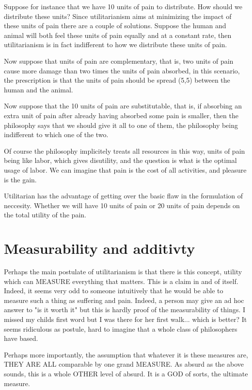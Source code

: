 \documentclass[12pt]{report}
\numberwithin{equation}{section}
\begin{document}
Suppose for instance that we have 10 units of pain to distribute. How should we distribute these units? Since utilitarianism aims at minimizing the impact of these units of pain there are a couple of solutions. Suppose the human and animal will both feel these units of pain equally and at a constant rate, then utilitarianism is in fact indifferent to how we distribute these units of pain. 

Now suppose that units of pain are complementary, that is, two units of pain cause more damage than two times the units of pain absorbed, in this scenario, the prescription is that the units of pain should be spread (5,5) between the human and the animal. 

Now suppose that the 10 units of pain are substitutable, that is, if absorbing an extra unit of pain after already having absorbed some pain is smaller, then the philosophy says that we should give it all to one of them, the philosophy being indifferent to which one of the two. 

Of course the philosophy implicitely treats all resources in this way, units of pain being like labor, which gives disutility, and the question is what is the optimal usage of labor. We can imagine that pain is the cost of all activities, and pleasure is the gain. 

Utilitarian has the advantage of getting over the basic flaw in the formulation of neccesity. Whether we will have 10 units of pain or 20 units of pain depends on the total utility of the pain. 

\section{Measurability and additivty}

Perhaps the main postulate of utilitarianism is that there is this concept, utility which can MEASURE everything that matters. This is a claim in and of itself. Indeed, it seems very odd to someone intuitively that he would be able to measure such a thing as suffering and pain. Indeed, a person may give an ad hoc answer to "is it worth it" but this is hardly proof of the measurability of things. I missed my childs first word but I was there for her first walk... which is better? It seems ridiculous as postule, hard to imagine that a whole class of philosophers have based. 

Perhaps more importantly, the assumption that whatever it is these measures are, THEY ARE ALL comparable by one grand MEASURE. As absurd as the above sounds, this is a whole OTHER level of absurd. It is a GOD of sorts, the ultimate measure. 
\end{document}
